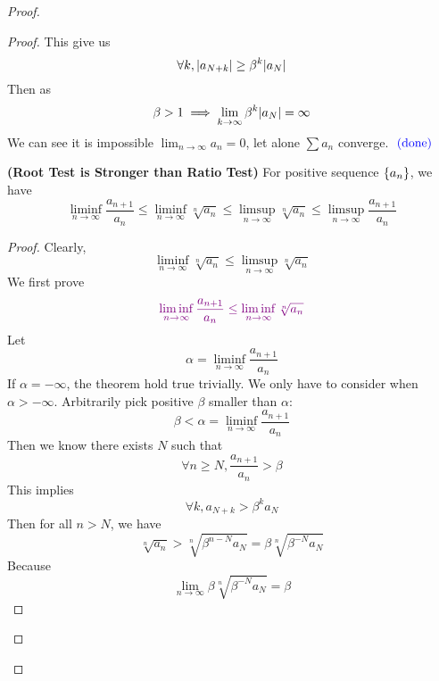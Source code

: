 \documentclass{report}
\begin{document}
\begin{proof}
\begin{proof}
This give us
\begin{equation}
\forall k, |a_{N+k}|\geq \beta^k |a_N|
\end{equation}
Then as 
\begin{equation}
\beta >1\implies \lim_{k\to\infty}\beta ^k|a_N|=\infty
\end{equation}
We can see it is impossible $\lim_{n\to\infty}a_n=0$, let alone $\sum a_n$ converge. $\textcolor{blue}{\text{ (done) }}$
\begin{theorem}
\label{4.5.3}
\textbf{(Root Test is Stronger than Ratio Test)} For positive sequence $\{ a_n \}$, we have
\begin{equation}
\liminf_{n\to\infty}\frac{a_{n+1}}{a_n}\leq \liminf_{n\to\infty} \sqrt[n]{a_n} \leq \limsup_{n\to\infty} \sqrt[n]{a_n} \leq \limsup_{n\to\infty} \frac{a_{n+1}}{a_n}
\end{equation}
\end{theorem}
\begin{proof}
Clearly, 
\begin{equation}
\liminf_{n\to\infty} \sqrt[n]{a_n}\leq \limsup_{n\to\infty} \sqrt[n]{a_n}  
\end{equation}
We first prove
\begin{equation}
  \textcolor{violet}{\liminf_{n\to\infty} \frac{a_{n+1}}{a_n}\leq \liminf_{n\to\infty} \sqrt[n]{a_n}}
\end{equation}
Let 
\begin{equation}
\alpha =\liminf_{n\to\infty} \frac{a_{n+1}}{a_n}
\end{equation}
If $\alpha =-\infty$, the theorem hold true trivially. We only have to consider when $\alpha >-\infty$. Arbitrarily pick positive $\beta $ smaller than $\alpha $:
\begin{equation}
\beta <\alpha=\liminf_{n\to\infty} \frac{a_{n+1}}{a_n}
\end{equation}
Then we know there exists $N$ such that
 \begin{equation}
\forall n\geq N, \frac{a_{n+1}}{a_n}>\beta 
\end{equation}
This implies 
\begin{equation}
\forall k, a_{N+k}>\beta^k a_N
\end{equation}
Then for all $n>N$, we have
 \begin{equation}
   \sqrt[n]{a_n}>\sqrt[n]{ \beta^{n-N}a_{N}}=\beta \sqrt[n]{\beta^{-N}a_N} 
\end{equation}
Because 
\begin{equation}
\lim_{n\to\infty}\beta \sqrt[n]{\beta^{-N}a_N}=\beta 
\end{equation}

\end{proof}
\end{proof}
\end{proof}
\end{document}
